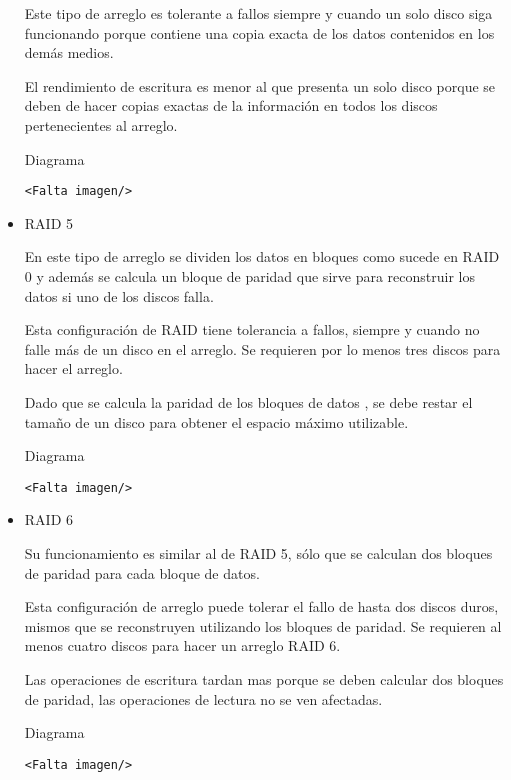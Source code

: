 \begin{itemize}
Este tipo de arreglo es tolerante a fallos siempre y cuando un solo disco siga funcionando porque contiene una copia exacta de los datos contenidos en los dem\'{a}s medios.

El rendimiento de escritura es menor al que presenta un solo disco porque se deben de hacer copias exactas de la informaci\'{o}n en todos los discos pertenecientes al arreglo.

Diagrama \cite{0a250ce04fb10680f70cb2c3efd365b1}
{\large\begin{verbatim}<Falta imagen/>\end{verbatim}}

  \item RAID 5

En este tipo de arreglo se dividen los datos en bloques como sucede en RAID 0 y adem\'{a}s se calcula un bloque de paridad que sirve para reconstruir los datos si uno de los discos falla.

Esta configuraci\'{o}n de RAID tiene tolerancia a fallos, siempre y cuando no falle m\'{a}s de un disco en el arreglo. Se requieren por lo menos tres discos para hacer el arreglo.

Dado que se calcula la paridad de los bloques de datos , se debe restar el tama\~{n}o de un disco para obtener el espacio m\'{a}ximo utilizable.
  
Diagrama \cite{9397b15f6a384de60446b869f05412af}
{\large\begin{verbatim}<Falta imagen/>\end{verbatim}}

  \item RAID 6

Su funcionamiento es similar al de RAID 5, s\'{o}lo que se calculan dos bloques de paridad para cada bloque de datos.

Esta configuraci\'{o}n de arreglo puede tolerar el fallo de hasta dos discos duros, mismos que se reconstruyen utilizando los bloques de paridad. Se requieren al menos cuatro discos para hacer un arreglo RAID 6.

Las operaciones de escritura tardan mas porque se deben calcular dos bloques de paridad, las operaciones de lectura no se ven afectadas.
  
Diagrama \cite{9e2f3e1ba21ce971703a62c6217946ae}
{\large\begin{verbatim}<Falta imagen/>\end{verbatim}}
  
\end{itemize}

